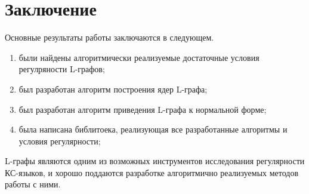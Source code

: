 \chapter*{Заключение}						%

Основные результаты работы заключаются в следующем.
\begin{enumerate}
  \item были найдены алгоритмически реализуемые достаточные условия регулряности L-графов;
  \item был разработан алгоритм построения ядер L-графа;
  \item был разработан алгоритм приведения L-графа к нормальной форме;
  \item была написана библитоека, реализующая все разработанные алгоритмы и условия регулярности;
\end{enumerate}
L-графы являются одним из возможных инструментов исследования регулярности КС-языков, 
и хорошо поддаются разработке алгоритмично реализуемых методов работы с ними.
\clearpage